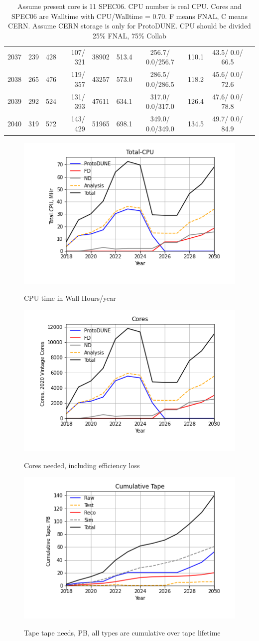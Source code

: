 \documentclass[12pt]{article}
\begin{document}
\begin{table}
\begin{tabular}[h]{crrrrrcccc}
2037&	 239&	 428&	 107/ 321&	 38902&	    513.4&	 256.7/  0.0/256.7&	    110.1&	  43.5/  0.0/ 66.5\\
2038&	 265&	 476&	 119/ 357&	 43257&	    573.0&	 286.5/  0.0/286.5&	    118.2&	  45.6/  0.0/ 72.6\\
2039&	 292&	 524&	 131/ 393&	 47611&	    634.1&	 317.0/  0.0/317.0&	    126.4&	  47.6/  0.0/ 78.8\\
2040&	 319&	 572&	 143/ 429&	 51965&	    698.1&	 349.0/  0.0/349.0&	    134.5&	  49.7/  0.0/ 84.9\\
\end{tabular}
\caption{Assume present core is   11 SPEC06. CPU number is real CPU. Cores and SPEC06 are Walltime with CPU/Walltime =  0.70.  F means FNAL, C means CERN. Assume CERN storage is only  for ProtoDUNE. CPU should be divided 25\% FNAL, 75\% Collab}\normalsize
 \end{table}
\pagebreak\begin{figure}
\centering\includegraphics[height=0.4\textwidth]{Total-CPU.png}\label{TotalCPU}
\caption{CPU time in Wall Hours/year}
\end{figure}
\begin{figure}
\centering\includegraphics[height=0.4\textwidth]{Cores.png}\label{Cores}
\caption{Cores needed, including efficiency loss}
\end{figure}
\begin{figure}
\centering\includegraphics[height=0.4\textwidth]{Cumulative-Tape.png}\label{CumulativeTape}
\caption{Tape tape needs, PB, all types are cumulative over tape lifetime}
\end{figure}
\end{document}
